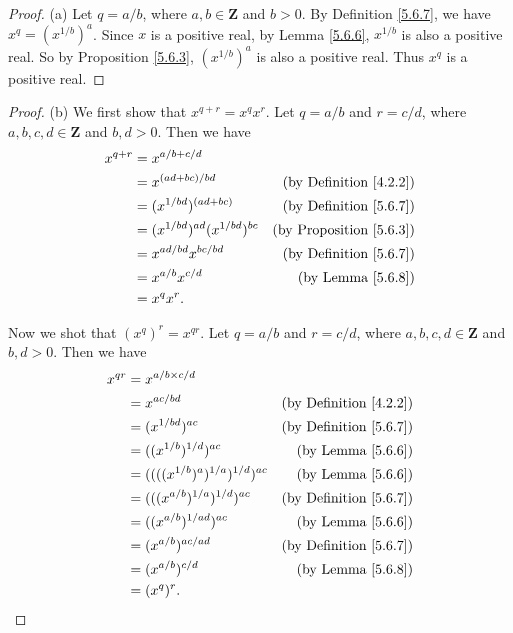 \begin{proof}{(a)}
    Let \(q = a / b\), where \(a, b \in \mathbf{Z}\) and \(b > 0\).
    By Definition \ref{5.6.7}, we have \(x^q = (x^{1 / b})^a\).
    Since \(x\) is a positive real, by Lemma \ref{5.6.6}, \(x^{1 / b}\) is also a positive real.
    So by Proposition \ref{5.6.3}, \((x^{1 / b})^a\) is also a positive real.
    Thus \(x^q\) is a positive real.
\end{proof}

\begin{proof}{(b)}
    We first show that \(x^{q + r} = x^q x^r\).
    Let \(q = a / b\) and \(r = c / d\), where \(a, b, c, d \in \mathbf{Z}\) and \(b, d > 0\).
    Then we have
    \begin{align*}
        x^{q + r} & = x^{a / b + c / d}                                                         \\
                  & = x^{(ad + bc) / bd}                  & \text{(by Definition \ref{4.2.2})}  \\
                  & = (x^{1 / bd})^{(ad + bc)}            & \text{(by Definition \ref{5.6.7})}  \\
                  & = (x^{1 / bd})^{ad} (x^{1 / bd})^{bc} & \text{(by Proposition \ref{5.6.3})} \\
                  & = x^{ad / bd} x^{bc / bd}             & \text{(by  Definition \ref{5.6.7})} \\
                  & = x^{a / b} x^{c / d}                 & \text{(by Lemma \ref{5.6.8})}       \\
                  & = x^q x^r.
    \end{align*}

    Now we shot that \((x^q)^r = x^{qr}\).
    Let \(q = a / b\) and \(r = c / d\), where \(a, b, c, d \in \mathbf{Z}\) and \(b, d > 0\).
    Then we have
    \begin{align*}
        x^{qr} & = x^{a / b \times c / d}                                                        \\
               & = x^{ac / bd}                              & \text{(by Definition \ref{4.2.2})} \\
               & = (x^{1 / bd})^{ac}                        & \text{(by Definition \ref{5.6.7})} \\
               & = ((x^{1 / b})^{1 / d})^{ac}               & \text{(by Lemma \ref{5.6.6})}      \\
               & = ((((x^{1 / b})^a)^{1 / a})^{1 / d})^{ac} & \text{(by Lemma \ref{5.6.6})}      \\
               & = (((x^{a / b})^{1 / a})^{1 / d})^{ac}     & \text{(by Definition \ref{5.6.7})} \\
               & = ((x^{a / b})^{1 / ad})^{ac}              & \text{(by Lemma \ref{5.6.6})}      \\
               & = (x^{a / b})^{ac / ad}                    & \text{(by Definition \ref{5.6.7})} \\
               & = (x^{a / b})^{c / d}                      & \text{(by Lemma \ref{5.6.8})}      \\
               & = (x^q)^r.
    \end{align*}
\end{proof}

